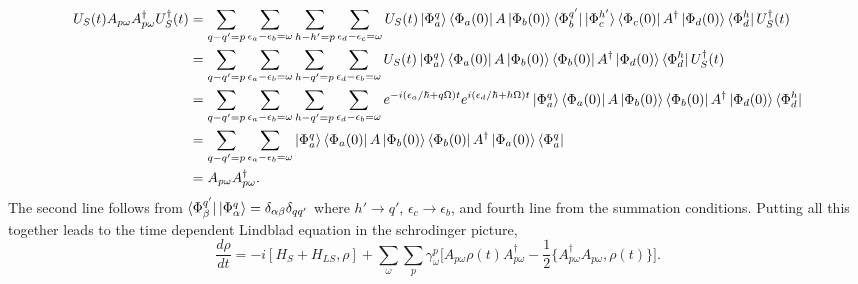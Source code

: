 \documentclass[10pt]{article}
\numberwithin{equation}{section}
\begin{document}
\begin{align}
U_{S}(t)A_{p\omega}A_{p\omega}^{\dagger}U_{S}^{\dagger}(t) &= \sum_{q-q' = p} \sum_{\epsilon_{a}-\epsilon_{b} = \omega}  \sum_{h-h' = p} \sum_{\epsilon_{d}-\epsilon_{c} = \omega} U_{S}(t)\ket{\Phi_{a}^{q}}  \bra{\Phi_{a}(0)}A\ket{\Phi_{b}(0)}\bra{\Phi_{b}^{q'}}\ket{\Phi_{c}^{h'}}\bra{\Phi_{c}(0)}A^{\dagger}\ket{\Phi_{d}(0)}\bra{\Phi_{d}^{h}}U_{S}^{\dagger}(t) \\
&= \sum_{q-q' = p} \sum_{\epsilon_{a}-\epsilon_{b} = \omega}  \sum_{h-q' = p} \sum_{\epsilon_{d}-\epsilon_{b} = \omega} U_{S}(t)\ket{\Phi_{a}^{q}}  \bra{\Phi_{a}(0)}A\ket{\Phi_{b}(0)}\bra{\Phi_{b}(0)}A^{\dagger}\ket{\Phi_{d}(0)}\bra{\Phi_{d}^{h}}U_{S}^{\dagger}(t) \\
&= \sum_{q-q' = p} \sum_{\epsilon_{a}-\epsilon_{b} = \omega}  \sum_{h-q' = p} \sum_{\epsilon_{d}-\epsilon_{b} = \omega}e^{-i(\epsilon_{a}/\hbar+q\Omega)t}e^{i(\epsilon_{d}/\hbar+h\Omega)t}\ket{\Phi_{a}^{q}}  \bra{\Phi_{a}(0)}A\ket{\Phi_{b}(0)}\bra{\Phi_{b}(0)}A^{\dagger}\ket{\Phi_{d}(0)}\bra{\Phi_{d}^{h}} \\
&= \sum_{q-q' = p} \sum_{\epsilon_{a}-\epsilon_{b} = \omega} \ket{\Phi_{a}^{q}}  \bra{\Phi_{a}(0)}A\ket{\Phi_{b}(0)}\bra{\Phi_{b}(0)}A^{\dagger}\ket{\Phi_{a}(0)}\bra{\Phi_{a}^{q}} \\
&= A_{p\omega}A_{p\omega}^{\dagger}.
\end{align}
The second line follows from $\bra{\Phi_{\beta}^{q'}}\ket{\Phi_{\alpha}^{q}} = \delta_{\alpha\beta}\delta_{qq'}$ where $h'\rightarrow q'$, $\epsilon_{c}\rightarrow\epsilon_{b}$, and fourth line from the summation conditions.
Putting all this together leads to the time dependent Lindblad equation in the schrodinger picture,
\begin{equation}
\frac{d\rho}{dt} = -i[H_{S}+H_{LS},\rho] + \sum_{\omega}\sum_{p}\gamma_{\omega}^{p} \bigg[A_{p\omega}\rho(t)A_{p\omega}^{\dagger} - \frac{1}{2}\{A_{p\omega}^{\dagger}A_{p\omega},\rho(t)\}\bigg].
\end{equation}
\end{document}
